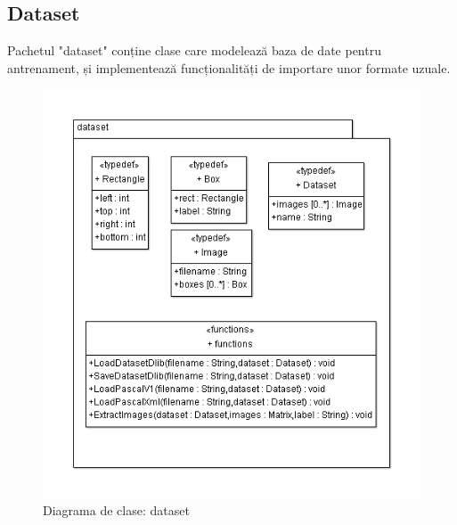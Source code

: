 \subsection{Dataset}
Pachetul "dataset" conține clase care modelează baza de date pentru antrenament, și implementează funcționalități de importare unor formate uzuale.
\begin{figure}[H]
	\centering
	\includegraphics[width=1.00\textwidth]{uml/datasetClassDiagram.png}
	\caption{Diagrama de clase: dataset}
	\label{fig:datasetClassDiagram}
\end{figure}

